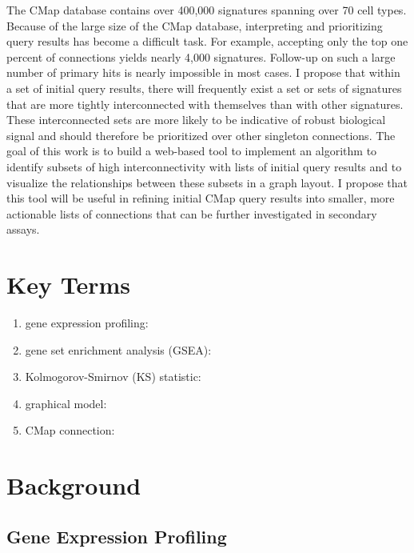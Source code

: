 \documentclass[12pt]{article}
\begin{document}
The CMap database contains over 400,000 signatures spanning over 70 cell types. Because of the large size of the CMap database, interpreting and prioritizing query results has become a difficult task. For example, accepting only the top one percent of connections yields nearly 4,000 signatures. Follow-up on such a large number of primary hits is nearly impossible in most cases. I propose that within a set of initial query results, there will frequently exist a set or sets of signatures that are more tightly interconnected with themselves than with other signatures. These interconnected sets are more likely to be indicative of robust biological signal and should therefore be prioritized over other singleton connections. The goal of this work is to build a web-based tool to implement an algorithm to identify subsets of high interconnectivity with lists of initial query results and to visualize the relationships between these subsets in a graph layout. I propose that this tool will be useful in refining initial CMap query results into smaller, more actionable lists of connections that can be further investigated in secondary assays.

\section{Key Terms}
\begin{enumerate}
\item gene expression profiling:
\item gene set enrichment analysis (GSEA):
\item Kolmogorov-Smirnov (KS) statistic:
\item graphical model:
\item CMap connection: 
\end{enumerate}

\section{Background}
\subsection{Gene Expression Profiling}
\end{document}
